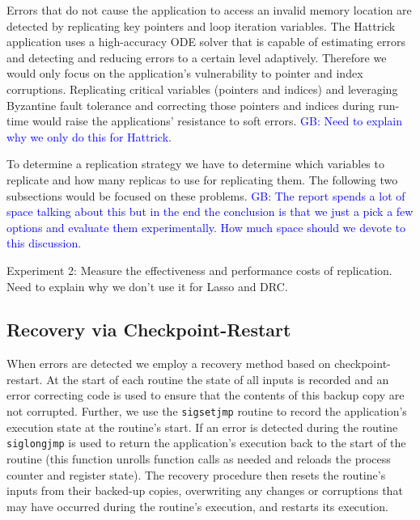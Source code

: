 \documentclass[prodmode,acmtecs]{acmconf} %
\newcommand{\greg}[1]{%
  \textcolor{blue}{GB: #1}
}
\begin{document}
Errors that do not cause the application to access an invalid memory location are detected by replicating key pointers and loop iteration variables.
The Hattrick application uses a high-accuracy ODE solver that is capable of estimating errors and detecting and reducing errors to a certain level adaptively. 
Therefore we would only focus on the application's vulnerability to pointer and index corruptions. 
Replicating critical variables (pointers and indices) and leveraging Byzantine fault tolerance and correcting those pointers and indices during run-time would raise the applications' resistance to soft errors.
\greg{Need to explain why we only do this for Hattrick.}

To determine a replication strategy we have to determine which variables to replicate and how many replicas to use for replicating them. The following two subsections would be focused on these problems.
\greg{The report spends a lot of space talking about this but in the end the conclusion is that we just a pick a few options and evaluate them experimentally. How much space should we devote to this discussion.}

Experiment 2: Measure the effectiveness and performance costs of replication. Need to explain why we don't use it for Lasso and DRC.

\subsection{Recovery via Checkpoint-Restart}
\label{sec:res_tech:cr}

When errors are detected we employ a recovery method based on checkpoint-restart.
At the start of each routine the state of all inputs is recorded and an error correcting code is used to ensure that the contents of this backup copy are not corrupted.
Further, we use the \texttt{sigsetjmp} routine to record the application's execution state at the routine's start.
If an error is detected during the routine \texttt{siglongjmp} is used to return the application's execution back to the start of the routine (this function unrolls function calls as needed and reloads the process counter and register state).
The recovery procedure then resets the routine's inputs from their backed-up copies, overwriting any changes or corruptions that may have occurred during the routine's execution, and restarts its execution.
\end{document}
